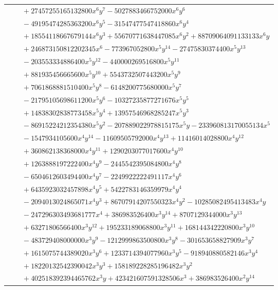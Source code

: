 \documentclass[11pt]{article}
\begin{document}
\begin{longtable}{@{}ll@{}}
 & $\quad +27457255165132800x^{6}y^{7}-5027883466752000x^{6}y^{6}$\\
 & $\quad -49195474285363200x^{6}y^{5}-31547477547418860x^{6}y^{4}$\\
 & $\quad +18554118667679144x^{6}y^{3}+55670771638447085x^{6}y^{2}+88709064091133133x^{6}y$\\
 & $\quad +246873150812202345x^{6}-773967052800x^{5}y^{14}-27475830374400x^{5}y^{13}$\\
 & $\quad -203553334886400x^{5}y^{12}-440000269516800x^{5}y^{11}$\\
 & $\quad +881935456665600x^{5}y^{10}+5543732507443200x^{5}y^{9}$\\
 & $\quad +7061868881510400x^{5}y^{8}-6148200775680000x^{5}y^{7}$\\
 & $\quad -21795105698611200x^{5}y^{6}-10327235877271676x^{5}y^{5}$\\
 & $\quad +14838302838773458x^{5}y^{4}+13957546968285247x^{5}y^{3}$\\
 & $\quad -86915224212354380x^{5}y^{2}-207889022978815175x^{5}y-233960813170055134x^{5}$\\
 & $\quad -1547934105600x^{4}y^{14}-11609505792000x^{4}y^{13}+11416014028800x^{4}y^{12}$\\
 & $\quad +360862138368000x^{4}y^{11}+1290203077017600x^{4}y^{10}$\\
 & $\quad +1263888197222400x^{4}y^{9}-2445542395084800x^{4}y^{8}$\\
 & $\quad -6504612603494400x^{4}y^{7}-2249922222491117x^{4}y^{6}$\\
 & $\quad +6435923032457898x^{4}y^{5}+5422783146359979x^{4}y^{4}$\\
 & $\quad -2094013024865071x^{4}y^{3}+86707914207550323x^{4}y^{2}-10285082495413483x^{4}y$\\
 & $\quad -247296303493681777x^{4}+386983526400x^{3}y^{14}+8707129344000x^{3}y^{13}$\\
 & $\quad +63271806566400x^{3}y^{12}+195233189068800x^{3}y^{11}+168144342220800x^{3}y^{10}$\\
 & $\quad -483729408000000x^{3}y^{9}-1212999863500800x^{3}y^{8}-301653658827909x^{3}y^{7}$\\
 & $\quad +1615075744389020x^{3}y^{6}+1233714394077960x^{3}y^{5}-918940880582146x^{3}y^{4}$\\
 & $\quad +18220132542390042x^{3}y^{3}+158189228285196482x^{3}y^{2}$\\
 & $\quad +402518392394465762x^{3}y+423421607591328506x^{3}+386983526400x^{2}y^{14}$\\

\end{longtable}
\end{document}
